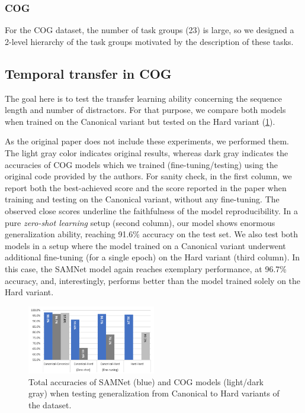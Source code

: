 \subsubsection{COG}
\label{sec:reasoning-cog}
For the COG dataset, the number of task groups (23) is large, so we designed a 2-level hierarchy of the task groups motivated by the
description of these tasks.


\subsection{Temporal transfer in COG}
\label{sec:temporal}


The goal here is to test the transfer learning ability concerning the sequence length and number of distractors.
For that purpose, we compare both models when trained on the Canonical variant but tested on the 
Hard variant (\cref{fig:samnet_cog_overall_transfer}).

As the original paper does not include these experiments, we performed them. The light gray color indicates original results, whereas dark gray indicates the accuracies of COG models which we trained (fine-tuning/testing) using the original code provided by the authors.
For sanity check, in the first column, we report both the best-achieved score and the score reported in the paper when training and testing on the Canonical variant, without any fine-tuning. The observed close scores underline the faithfulness of the model reproducibility.
In a pure \textit{zero-shot learning} setup (second column), our model shows enormous generalization ability, reaching 91.6\% accuracy on the test set.
We also test both models in a setup where the model trained on a Canonical variant underwent additional fine-tuning (for a single epoch) on the Hard variant (third column).
In this case, the SAMNet model again reaches exemplary performance, at 96.7\% accuracy, and, interestingly, performs better than the model trained solely on the Hard variant.

\begin{figure}[htb]
	\centering
	\includegraphics[width=0.5\textwidth]{img/results/samnet_cog_overall_transfer.png}
	\caption{Total accuracies of SAMNet (blue) and COG models (light/dark gray) when testing generalization from Canonical to Hard variants of the dataset.}
	\label{fig:samnet_cog_overall_transfer}
\end{figure}


